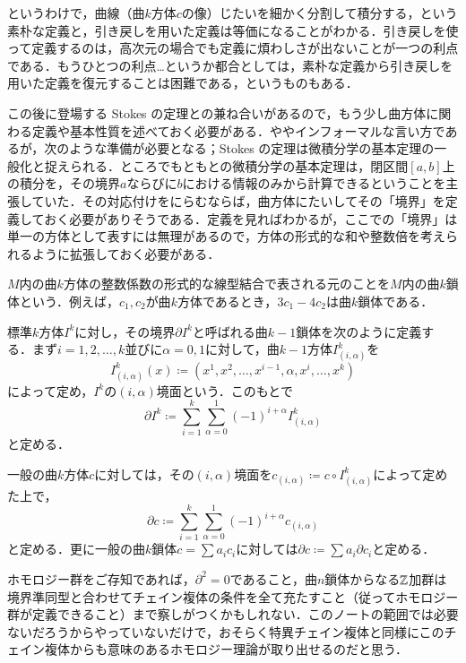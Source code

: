 というわけで，曲線（曲$k$方体$c$の像）じたいを細かく分割して積分する，という素朴な定義と，引き戻しを用いた定義は等価になることがわかる．引き戻しを使って定義するのは，高次元の場合でも定義に煩わしさが出ないことが一つの利点である．もうひとつの利点…というか都合としては，素朴な定義から引き戻しを用いた定義を復元することは困難である，というものもある．

この後に登場する Stokes の定理との兼ね合いがあるので，もう少し曲方体に関わる定義や基本性質を述べておく必要がある．ややインフォーマルな言い方であるが，次のような準備が必要となる；Stokes の定理は微積分学の基本定理の一般化と捉えられる．ところでもともとの微積分学の基本定理は，閉区間$[a,b]$上の積分を，その境界$a$ならびに$b$における情報のみから計算できるということを主張していた．その対応付けをにらむならば，曲方体にたいしてその「境界」を定義しておく必要がありそうである．定義を見ればわかるが，ここでの「境界」は単一の方体として表すには無理があるので，方体の形式的な和や整数倍を考えられるように拡張しておく必要がある．

\begin{defi}
$M$内の曲$k$方体の整数係数の形式的な線型結合で表される元のことを$M$内の曲$k$鎖体という．例えば，$c_1, c_2$が曲$k$方体であるとき，$3c_1 -4c_2$は曲$k$鎖体である．

標準$k$方体$I^k$に対し，その境界$\partial I^k$と呼ばれる曲$k-1$鎖体を次のように定義する．まず$i = 1, 2, \dots, k$並びに$\alpha = 0,1$に対して，曲$k-1$方体$I^k_{(i,\alpha)}$を
\begin{equation}
I^k_{(i,\alpha)}(x) \coloneqq (x^1, x^2, \dots, x^{i-1}, \alpha, x^{i}, \dots, x^k)
\end{equation}によって定め，$I^k$の$(i, \alpha)$境面という．このもとで
\begin{equation}
\partial I^k \coloneqq \sum_{i=1}^k \sum_{\alpha = 0}^1 (-1)^{i+\alpha} I^k_{(i,\alpha)}
\end{equation}と定める．

一般の曲$k$方体$c$に対しては，その$(i, \alpha)$境面を$c_{(i, \alpha)} \coloneqq c \circ I^k_{(i, \alpha)}$によって定めた上で，
\begin{equation}
\partial c \coloneqq \sum_{i=1}^k \sum_{\alpha = 0}^1 (-1)^{i+\alpha} c_{(i,\alpha)}
\end{equation}と定める．更に一般の曲$k$鎖体$c = \sum a_i c_i$に対しては$\partial c \coloneqq \sum a_i \partial c_i$と定める．
\end{defi}

\begin{dig}
ホモロジー群をご存知であれば，$\partial^2 = 0$であること，曲$n$鎖体からなる$\mathbb{Z}$加群は境界準同型と合わせてチェイン複体の条件を全て充たすこと（従ってホモロジー群が定義できること）まで察しがつくかもしれない．このノートの範囲では必要ないだろうからやっていないだけで，おそらく特異チェイン複体と同様にこのチェイン複体からも意味のあるホモロジー理論が取り出せるのだと思う．
\end{dig}

